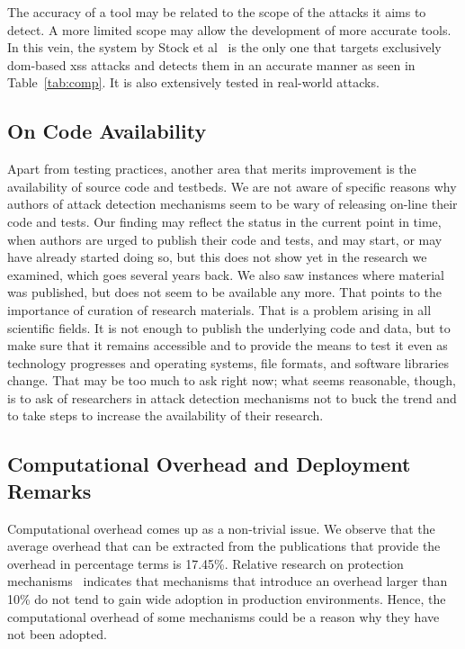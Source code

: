 \documentclass[conference]{IEEEtran}
\begin{document}
The accuracy of a tool may be related to the scope of the attacks it
aims to detect. A more limited scope may allow the development of more
accurate tools. In this vein, the system by Stock et al~\cite{SLMS14}
is the only one that targets exclusively {\sc dom}-based {\sc xss}
attacks and detects them in an accurate manner as seen in
Table~\ref{tab:comp}. It is also extensively tested in real-world
attacks.

\subsection{On Code Availability}

Apart from testing practices, another area that merits improvement is
the availability of source code and testbeds. We are not aware of
specific reasons why authors of attack detection mechanisms seem to be
wary of releasing on-line their code and tests. Our finding may reflect
the status in the current point in time, when authors are urged to
publish their code and tests, and may start, or may have already
started doing so, but this does not show yet in the research we
examined, which goes several years back. We also saw instances where
material was published, but does not seem to be available any more.
That points to the importance of curation of research materials. That
is a problem arising in all scientific fields. It is not enough to
publish the underlying code and data, but to make sure that it remains
accessible and to provide the means to test it even as technology
progresses and operating systems, file formats, and software libraries
change. That may be too much to ask right now; what seems reasonable,
though, is to ask of researchers in attack detection mechanisms not to
buck the trend and to take steps to increase the availability of their
research.

\subsection{Computational Overhead and Deployment Remarks}

Computational overhead comes up as a non-trivial issue. We observe
that the average overhead that can be extracted from the publications
that provide the overhead in percentage terms is 17.45\%. Relative
research on protection mechanisms~\cite{SPWS13} indicates that
mechanisms that introduce an overhead larger than 10\% do not tend to
gain wide adoption in production environments. Hence, the
computational overhead of some mechanisms could be a reason why they
have not been adopted.
\end{document}
